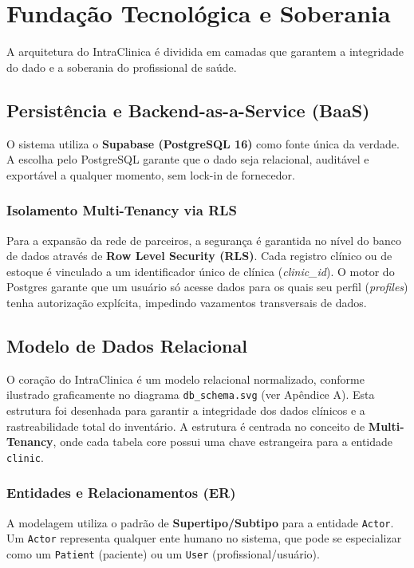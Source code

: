 \chapter{Fundação Tecnológica e Soberania}

A arquitetura do IntraClinica é dividida em camadas que garantem a integridade do dado e a soberania do profissional de saúde.

\section{Persistência e Backend-as-a-Service (BaaS)}

O sistema utiliza o \textbf{Supabase (PostgreSQL 16)} como fonte única da verdade. A escolha pelo PostgreSQL garante que o dado seja relacional, auditável e exportável a qualquer momento, sem lock-in de fornecedor.

\subsection{Isolamento Multi-Tenancy via RLS}
Para a expansão da rede de parceiros, a segurança é garantida no nível do banco de dados através de \textbf{Row Level Security (RLS)}. Cada registro clínico ou de estoque é vinculado a um identificador único de clínica (\textit{clinic\_id}). O motor do Postgres garante que um usuário só acesse dados para os quais seu perfil (\textit{profiles}) tenha autorização explícita, impedindo vazamentos transversais de dados.

\section{Modelo de Dados Relacional}

O coração do IntraClinica é um modelo relacional normalizado, conforme ilustrado graficamente no diagrama \texttt{db\_schema.svg} (ver Apêndice A). Esta estrutura foi desenhada para garantir a integridade dos dados clínicos e a rastreabilidade total do inventário. A estrutura é centrada no conceito de \textbf{Multi-Tenancy}, onde cada tabela core possui uma chave estrangeira para a entidade \texttt{clinic}.

\subsection{Entidades e Relacionamentos (ER)}

A modelagem utiliza o padrão de \textbf{Supertipo/Subtipo} para a entidade \texttt{Actor}. Um \texttt{Actor} representa qualquer ente humano no sistema, que pode se especializar como um \texttt{Patient} (paciente) ou um \texttt{User} (profissional/usuário).

